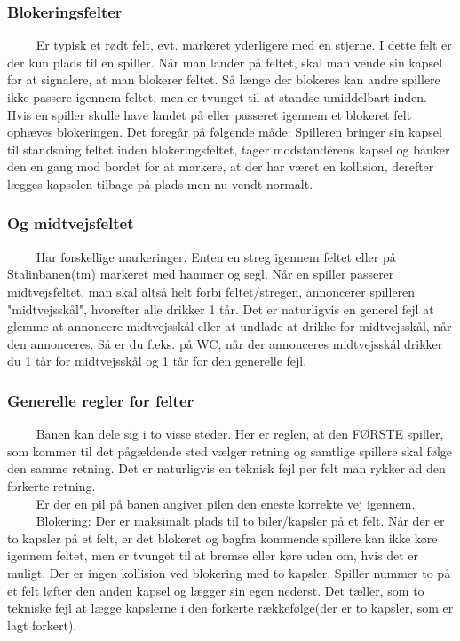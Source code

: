 \documentclass[12pt]{article}
\begin{document}
\subsubsection*{Blokeringsfelter}

$\qquad$ Er typisk et rødt felt, evt. markeret yderligere med en stjerne. I dette felt er der kun plads til en spiller. Når man lander på feltet, skal man vende sin kapsel for at signalere, at man blokerer feltet. Så længe der blokeres kan andre spillere ikke passere igennem feltet, men er tvunget til at standse umiddelbart inden. Hvis en spiller skulle have landet på eller passeret igennem et blokeret felt ophæves blokeringen. Det foregår på følgende måde: Spilleren bringer sin kapsel til standsning feltet inden blokeringsfeltet, tager modstanderens kapsel og banker den en gang mod bordet for at markere, at der har været en kollision, derefter lægges kapselen tilbage på plads men nu vendt normalt.

\subsubsection*{Og midtvejsfeltet}
$\qquad$ Har forskellige markeringer. Enten en streg igennem feltet eller på Stalinbanen(tm) markeret med hammer og segl.
Når en spiller passerer midtvejsfeltet, man skal altså helt forbi feltet/stregen, annoncerer spilleren "midtvejsskål", hvorefter alle drikker 1 tår. Det er naturligvis en generel fejl at glemme at annoncere midtvejsskål eller at undlade at drikke for midtvejsskål, når den annonceres. Så er du f.eks. på WC, når der annonceres midtvejsskål drikker du 1 tår for midtvejsskål og 1 tår for den generelle fejl.

\subsubsection*{Generelle regler for felter}

$\qquad$ Banen kan dele sig i to visse steder. Her er reglen, at den FØRSTE spiller, som kommer til det pågældende sted vælger retning og samtlige spillere skal følge den samme retning. Det er naturligvis en teknisk fejl per felt man rykker ad den forkerte retning.\\

$\qquad$ Er der en pil på banen angiver pilen den eneste korrekte vej igennem.\\

$\qquad$ Blokering: Der er maksimalt plads til to biler/kapsler på et felt. Når der er to kapsler på et felt, er det blokeret og bagfra kommende spillere kan ikke køre igennem feltet, men er tvunget til at bremse eller køre uden om, hvis det er muligt. Der er ingen kollision ved blokering med to kapsler. Spiller nummer to på et felt løfter den anden kapsel og lægger sin egen nederst. Det tæller, som to tekniske fejl at lægge kapslerne i den forkerte rækkefølge(der er to kapsler, som er lagt forkert).
\end{document}
